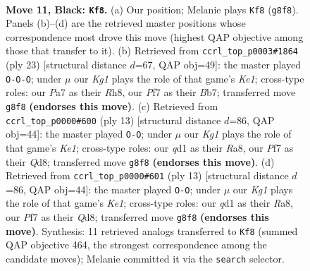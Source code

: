 \documentclass[11pt]{article}
\begin{document}
\clearpage

\begin{figure}[p]\centering
\begin{subfigure}{0.46\textwidth}\centering
\resizebox{\linewidth}{!}{%
\newchessgame
\chessboard[
  setfen={r1b1r1k1/ppp1qpp1/2nppn1p/P6P/2PP4/2P2NP1/3BPP2/R2QKB1R b KQ - 0 11},
  showmover=false,
  pgfstyle=straightmove, color=movearrow, markmove={g8-f8}
]}
\caption{}
\end{subfigure}\hfill
\begin{subfigure}{0.46\textwidth}\centering
\resizebox{\linewidth}{!}{%
\newchessgame
\chessboard[
  setfen={r3k2r/pbp1qp2/1pnppn1p/6p1/2PPP3/2P2P2/P2N1BPP/R2QKB1R b KQkq - 0 12},
  showmover=false,
  pgfstyle=straightmove, color=movearrow, markmove={e8-c8}
]}
\caption{}
\end{subfigure}
\\[4pt]
\begin{subfigure}{0.46\textwidth}\centering
\resizebox{\linewidth}{!}{%
\newchessgame
\chessboard[
  setfen={r1bqk2r/ppp2pbp/2nppnp1/8/2PPP3/P1N2N2/1P2BPPP/R1BQK2R b KQkq - 2 7},
  showmover=false,
  pgfstyle=straightmove, color=movearrow, markmove={e8-g8}
]}
\caption{}
\end{subfigure}\hfill
\begin{subfigure}{0.46\textwidth}\centering
\resizebox{\linewidth}{!}{%
\newchessgame
\chessboard[
  setfen={r1bqk2r/ppp2pbp/2nppnp1/8/2PPP3/P1N2N2/1P2BPPP/R1BQK2R b KQkq - 2 7},
  showmover=false,
  pgfstyle=straightmove, color=movearrow, markmove={e8-g8}
]}
\caption{}
\end{subfigure}
\caption{\textbf{Move 11, Black: \texttt{Kf8}.} (a) Our position; Melanie plays \texttt{Kf8} (\texttt{g8f8}). Panels (b)--(d) are the retrieved master positions whose correspondence most drove this move (highest QAP objective among those that transfer to it). (b) Retrieved from \texttt{ccrl\_top\_p0003\#1864} (ply 23) [structural distance $d$=67, QAP obj=49]: the master played \texttt{O-O-O}; under $\mu$ our \emph{Kg1} plays the role of that game's \emph{Ke1}; cross-type roles: our \emph{P}a7 as their \emph{R}h8, our \emph{P}f7 as their \emph{B}b7; transferred move \texttt{g8f8} \textbf{(endorses this move)}. (c) Retrieved from \texttt{ccrl\_top\_p0000\#600} (ply 13) [structural distance $d$=86, QAP obj=44]: the master played \texttt{O-O}; under $\mu$ our \emph{Kg1} plays the role of that game's \emph{Ke1}; cross-type roles: our \emph{q}d1 as their \emph{R}a8, our \emph{P}f7 as their \emph{Q}d8; transferred move \texttt{g8f8} \textbf{(endorses this move)}. (d) Retrieved from \texttt{ccrl\_top\_p0000\#601} (ply 13) [structural distance $d$=86, QAP obj=44]: the master played \texttt{O-O}; under $\mu$ our \emph{Kg1} plays the role of that game's \emph{Ke1}; cross-type roles: our \emph{q}d1 as their \emph{R}a8, our \emph{P}f7 as their \emph{Q}d8; transferred move \texttt{g8f8} \textbf{(endorses this move)}. Synthesis: 11 retrieved analogs transferred to \texttt{Kf8} (summed QAP objective 464, the strongest correspondence among the candidate moves); Melanie committed it via the \texttt{search} selector.}
\label{fig:thought-m21}
\end{figure}
\end{document}
